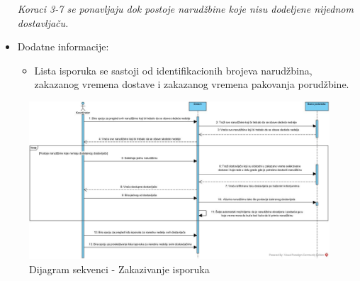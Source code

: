 \begin{itemize}
\begin{enumerate}
		\end{enumerate}
	  \textit{Koraci 3-7 se ponavljaju dok postoje narudžbine koje nisu dodeljene nijednom dostavljaču.}
   \item Dodatne informacije:
        \begin{itemize}
            \item Lista isporuka se sastoji od identifikacionih brojeva narudžbina, zakazanog vremena dostave i zakazanog vremena pakovanja porudžbine. 
        \end{itemize}
\end{itemize}

\begin{figure}[H]
\begin{center}
\includegraphics[width=\textwidth]{Pictures/sequence_scheduling_deliveries.jpg}
\end{center}
    \caption{Dijagram sekvenci - Zakazivanje isporuka}
\label{fig:Sequence_diagram_scheduling_deliveries}
\end{figure}

